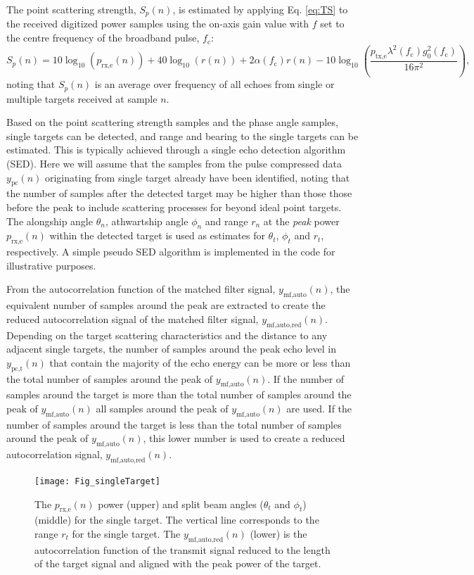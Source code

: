 \documentclass[preprint,12pt,TurnOnLineNumbers]{JASAnew}
\newcommand{\samplesymt}{n}
\newcommand{\fc}{f_{\textrm{c}}}
\newcommand{\ptxe}{p_{\textrm{tx,e}}}
\newcommand{\prxe}{p_{\textrm{rx,e}}}
\newcommand{\ypc}{y_{\textrm{pc}}}
\newcommand{\ypctarget}{y_{\textrm{pc,t}}}
\newcommand{\ymfauto}{y_{\textrm{mf,auto}}}
\newcommand{\ymfautored}{y_{\textrm{mf,auto,red}}}
\newcommand{\mysp}{S_p}
\newcommand{\range}{r}
\newcommand{\athw}{\phi}
\newcommand{\along}{\theta}
\newcommand{\gainzero}{g_0}
\newcommand{\wlen}{\lambda}
\newcommand{\absorp}{\alpha}
\begin{document}
The point scattering strength, $\mysp(\samplesymt)$, is estimated by applying Eq. \ref{eq:TS} to the received digitized power samples using the on-axis gain value with $f$ set to the centre frequency of the broadband pulse, $\fc$: 
\begin{equation}
\label{eq:Sp}
\mysp(\samplesymt) = 10\log_{10}(\prxe(\samplesymt)) + 40\log_{10}(\range(\samplesymt)) 
+ 2\absorp(\fc) \range(\samplesymt) - 10\log_{10}\left( \frac{\ptxe \wlen^2(\fc) \gainzero^2(\fc)}{16\pi^2} \right),
\end{equation}
%
noting that $\mysp(\samplesymt)$ is an average over frequency of all echoes from single or multiple targets received at sample $\samplesymt$.

Based on the point scattering strength samples and the phase angle samples, single targets can be detected, and range and bearing to the single targets can be estimated. This is typically achieved through a single echo detection algorithm (SED). Here we will assume that the samples from the pulse compressed data $\ypc(\samplesymt)$ originating from single target already have been identified, noting that the number of samples after the detected target may be higher than those those before the peak to include scattering processes for beyond ideal point targets. The alongship angle $\along_n$, athwartship angle $\athw_n$ and range $r_n$ at the \emph{peak} power $\prxe(\samplesymt)$ within the detected target is used as estimates for $\along_t$, $\athw_t$ and $r_t$, respectively. A simple pseudo SED algorithm is implemented in the code for illustrative purposes.

From the autocorrelation function of the matched filter signal, $\ymfauto(\samplesymt)$, the equivalent number of samples around the peak are extracted to create the reduced autocorrelation signal of the matched filter signal, $\ymfautored(\samplesymt)$. Depending on the target scattering characteristics and the distance to any adjacent single targets, the number of samples around the peak echo level in $\ypctarget(\samplesymt)$ that contain the majority of the echo energy can be more or less than the total number of samples around the peak of $\ymfauto(\samplesymt)$. If the number of samples around the target is more than the total number of samples around the peak of $\ymfauto(\samplesymt)$ all samples around the peak of $\ymfauto(\samplesymt)$ are used. If the number of samples around the target is less than the total number of samples around the peak of $\ymfauto(\samplesymt)$, this lower number is used to create a reduced autocorrelation signal, $\ymfautored(\samplesymt)$.
%
\begin{figure}
\texttt{[image: Fig\_singleTarget]}
\caption{\label{fi:SED} The $\prxe(\samplesymt)$ power (upper) and split beam angles ($\along_t$ and $\athw_t$) (middle) for the single target. The vertical line corresponds to the range $r_t$ for the single target. The $\ymfautored(\samplesymt)$ (lower) is the autocorrelation function of the transmit signal reduced to the length of the target signal and aligned with the peak power of the target.}
\end{figure}
\end{document}
